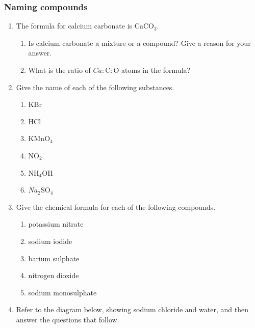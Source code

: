             \subsubsection{  Naming compounds
      }
            \nopagebreak
      \label{m38708*id65118}\begin{enumerate}[noitemsep, label=\textbf{\arabic*}. ] 
            \label{m38708*uid47}\item The formula for calcium carbonate is $\mathrm{CaCO}{}_{3}$.
\label{m38708*id65148}\begin{enumerate}[noitemsep, label=\textbf{\alph*}. ] 
            \label{m38708*uid48}\item Is calcium carbonate a mixture or a compound? Give a reason for your answer.
\label{m38708*uid49}\item What is the ratio of $Ca:\mathrm{C}:\mathrm{O}$ atoms in the formula?
\end{enumerate}
\label{m38708*uid50}\item Give the name of each of the following substances.
\label{m38708*id65189}\begin{enumerate}[noitemsep, label=\textbf{\alph*}. ] 
            \label{m38708*uid51}\item $\mathrm{KBr}$
\label{m38708*uid52}\item $\mathrm{HCl}$
\label{m38708*uid53}\item ${\mathrm{KMnO}}_{4}$\label{m38708*uid54}\item ${\mathrm{NO}}_{2}$\label{m38708*uid55}\item ${\mathrm{NH}}_{4}\mathrm{OH}$
\label{m38708*uid56}\item ${Na}_{2}{\mathrm{SO}}_{4}$\end{enumerate}
\label{m38708*uid57}\item Give the chemical formula for each of the following compounds.
\label{m38708*id65338}\begin{enumerate}[noitemsep, label=\textbf{\alph*}. ] 
            \label{m38708*uid58}\item potassium nitrate
\label{m38708*uid59}\item sodium iodide
\label{m38708*uid60}\item barium sulphate
\label{m38708*uid61}\item nitrogen dioxide
\label{m38708*uid62}\item sodium monosulphate
\end{enumerate}
\label{m38708*uid63}\item Refer to the diagram below, showing sodium chloride and water, and then answer the questions that follow.

\end{enumerate}
